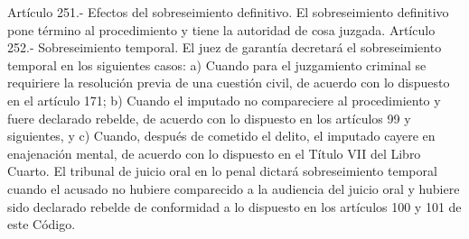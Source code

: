     Artículo 251.- Efectos del sobreseimiento definitivo. El sobreseimiento definitivo pone término al procedimiento y tiene la autoridad de cosa juzgada.
    Artículo 252.- Sobreseimiento temporal. El juez de garantía decretará el sobreseimiento temporal en los siguientes casos:
    a) Cuando para el juzgamiento criminal se
requiriere la resolución previa de una cuestión civil,
de acuerdo con lo dispuesto en el artículo 171;
    b) Cuando el imputado no compareciere al
procedimiento y fuere declarado rebelde, de acuerdo con
lo dispuesto en los artículos 99 y siguientes, y
    c) Cuando, después de cometido el delito, el
imputado cayere en enajenación mental, de acuerdo con lo
dispuesto en el Título VII del Libro Cuarto.
    El tribunal de juicio oral en lo penal dictará
sobreseimiento temporal cuando el acusado no hubiere
comparecido a la audiencia del juicio oral y hubiere
sido declarado rebelde de conformidad a lo dispuesto en
los artículos 100 y 101 de este Código.

